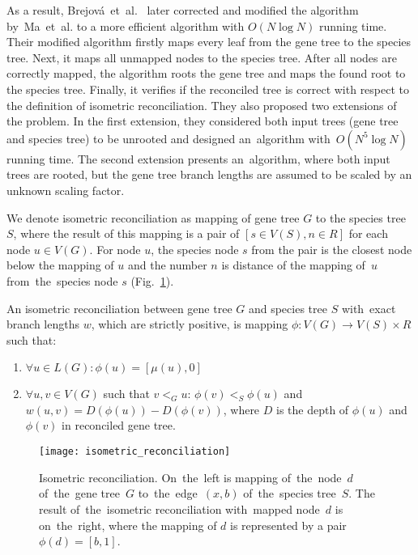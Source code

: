 As a result, Brejová~et~al.~\cite{brejova} later corrected and modified the algorithm by~Ma~et~al. to a more efficient algorithm with $O(N \log N)$ running time. Their modified algorithm firstly maps every leaf from the gene tree to the species tree. Next, it maps all unmapped nodes to the species tree. After all nodes are correctly mapped, the algorithm roots the gene tree and maps the found root to the species tree. Finally, it verifies if the reconciled tree is correct with respect to the definition of isometric reconciliation. They also proposed two extensions of the problem. In the first extension, they considered both input trees (gene tree and species tree) to be unrooted and designed an~algorithm with~$O(N^5 \log N)$ running time. The second extension presents an~algorithm, where both input trees are rooted, but the gene tree branch lengths are assumed to be scaled by an unknown scaling factor.

We denote isometric reconciliation as mapping of gene tree $G$ to the species tree $S$, where the result of this mapping is a pair of $[s \in V(S), n \in R]$ for each node $u \in V(G)$. For node $u$, the species node $s$ from the pair is the closest node below the mapping of $u$ and the number $n$ is distance of the mapping of~$u$ from~the~species node $s$ (Fig.~\ref{isometric_reconciliation}).

\begin{definition}
An isometric reconciliation between gene tree $G$ and species tree $S$ with~exact branch lengths $w$, which are strictly positive, is mapping $\phi: V(G) \rightarrow V(S) \times R$ such that:
	\begin{enumerate}\itemsep0em
	\item $\forall u \in L(G): \phi(u) = [\mu(u), 0]$
	\item $\forall u, v \in V(G)$ such that $v<_Gu$: $\phi(v)<_S\phi(u)$ and $w(u, v) = D(\phi(u)) - D(\phi(v))$, where $D$ is the depth of $\phi(u)$ and $\phi(v)$ in reconciled gene tree.
	\end{enumerate}
\end{definition}

\begin{figure}[ht!]
	\centering
  	\texttt{[image: isometric\_reconciliation]}
  	\caption[Isometric reconciliation]{Isometric reconciliation. On~the~left is mapping of~the~node~$d$ of~the~gene tree~$G$ to~the~edge~$(x, b)$ of~the~species tree~$S$. The result of~the~isometric reconciliation with~mapped node~$d$ is on~the~right, where the mapping of $d$ is represented by a pair $\phi(d) = [b, 1]$.}
  	\label{isometric_reconciliation}
\end{figure}

